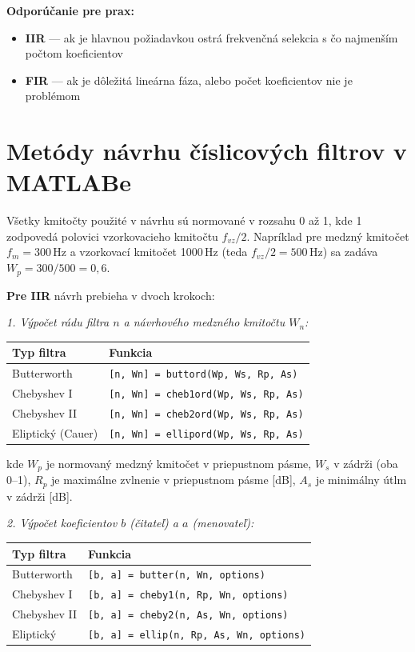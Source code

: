 \noindent\textbf{Odporúčanie pre prax:}
\begin{itemize}
  \item \textbf{IIR} --- ak je hlavnou požiadavkou ostrá frekvenčná selekcia
        s čo najmenším počtom koeficientov
  \item \textbf{FIR} --- ak je dôležitá lineárna fáza, alebo počet
        koeficientov nie je problémom
\end{itemize}

\section{Metódy návrhu číslicových filtrov v MATLABe}

Všetky kmitočty použité v návrhu sú normované v rozsahu 0 až 1, kde 1
zodpovedá polovici vzorkovacieho kmitočtu $f_{vz}/2$. Napríklad pre medzný
kmitočet $f_m = 300$\,Hz a vzorkovací kmitočet 1000\,Hz (teda $f_{vz}/2 =
500$\,Hz) sa zadáva $W_p = 300/500 = 0{,}6$.

\textbf{Pre IIR} návrh prebieha v dvoch krokoch:

\noindent\textit{1. Výpočet rádu filtra $n$ a návrhového medzného kmitočtu $W_n$:}

\begin{center}
\begin{tabular}{ll}
  \toprule
  \textbf{Typ filtra} & \textbf{Funkcia} \\
  \midrule
  Butterworth        & \texttt{[n, Wn] = buttord(Wp, Ws, Rp, As)} \\
  Chebyshev I        & \texttt{[n, Wn] = cheb1ord(Wp, Ws, Rp, As)} \\
  Chebyshev II       & \texttt{[n, Wn] = cheb2ord(Wp, Ws, Rp, As)} \\
  Eliptický (Cauer)  & \texttt{[n, Wn] = ellipord(Wp, Ws, Rp, As)} \\
  \bottomrule
\end{tabular}
\end{center}

\noindent kde $W_p$ je normovaný medzný kmitočet v priepustnom pásme,
$W_s$ v zádrži (oba 0--1), $R_p$ je maximálne zvlnenie v priepustnom pásme
[dB], $A_s$ je minimálny útlm v zádrži [dB].

\noindent\textit{2. Výpočet koeficientov $b$ (čitateľ) a $a$ (menovateľ):}

\begin{center}
\begin{tabular}{ll}
  \toprule
  \textbf{Typ filtra} & \textbf{Funkcia} \\
  \midrule
  Butterworth        & \texttt{[b, a] = butter(n, Wn, options)} \\
  Chebyshev I        & \texttt{[b, a] = cheby1(n, Rp, Wn, options)} \\
  Chebyshev II       & \texttt{[b, a] = cheby2(n, As, Wn, options)} \\
  Eliptický          & \texttt{[b, a] = ellip(n, Rp, As, Wn, options)} \\
  \bottomrule
\end{tabular}
\end{center}

